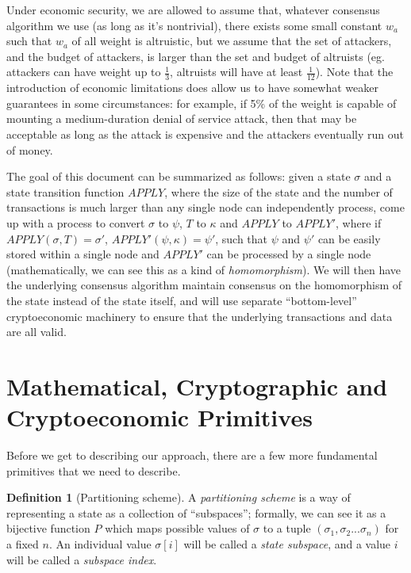 \documentclass[11pt,a4paper]{article}
\theoremstyle{plain}
\theoremstyle{definition}
\newtheorem{defn}{Definition}[section]
\theoremstyle{remark}
\begin{document}
Under economic security, we are allowed to assume that, whatever consensus algorithm we use (as long as it's nontrivial), there exists some small constant $w_a$ such that $w_a$ of all weight is altruistic, but we assume that the set of attackers, and the budget of attackers, is larger than the set and budget of altruists (eg. attackers can have weight up to $\frac{1}{3}$, altruists will have at least $\frac{1}{12}$). Note that the introduction of economic limitations does allow us to have somewhat weaker guarantees in some circumstances: for example, if 5\% of the weight is capable of mounting a medium-duration denial of service attack, then that may be acceptable as long as the attack is expensive and the attackers eventually run out of money.

The goal of this document can be summarized as follows: given a state $\sigma$ and a state transition function $APPLY$, where the size of the state and the number of transactions is much larger than any single node can independently process, come up with a process to convert $\sigma$ to $\psi$, $T$ to $\kappa$ and $APPLY$ to $APPLY'$, where if $APPLY(\sigma, T) = \sigma'$, $APPLY'(\psi, \kappa) = \psi'$, such that $\psi$ and $\psi'$ can be easily stored within a single node and $APPLY'$ can be processed by a single node (mathematically, we can see this as a kind of \emph{homomorphism}). We will then have the underlying consensus algorithm maintain consensus on the homomorphism of the state instead of the state itself, and will use separate ``bottom-level'' cryptoeconomic machinery to ensure that the underlying transactions and data are all valid.

\section{Mathematical, Cryptographic and Cryptoeconomic Primitives}

Before we get to describing our approach, there are a few more fundamental primitives that we need to describe.

\begin{defn}[Partitioning scheme]
A \emph{partitioning scheme} is a way of representing a state as a collection of ``subspaces''; formally, we can see it as a bijective function $P$ which maps possible values of $\sigma$ to a tuple $(\sigma_1, \sigma_2 ... \sigma_n)$ for a fixed $n$. An individual value $\sigma[i]$ will be called a \emph{state subspace}, and a value $i$ will be called a \emph{subspace index}.
\end{defn}
\end{document}
